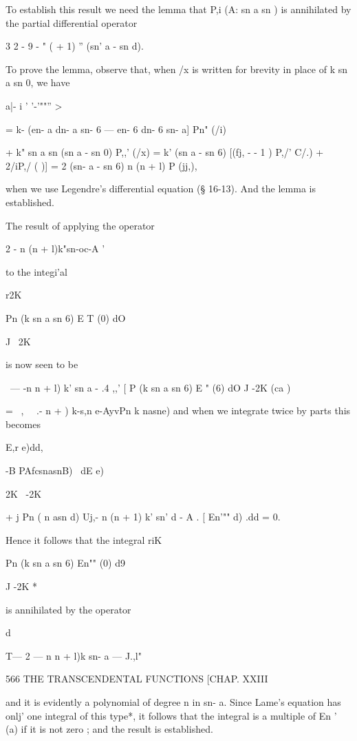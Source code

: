 {{{{{{{To establish this result we need the lemma that P,i (A: sn a sn ) is
annihilated by the partial differential operator

3 2 - 9 - " ( + 1) '' (sn' a - sn d).

To prove the lemma, observe that, when /x is written for brevity in
place of k sn a sn 0, we have



 a|- i ' '-'""'' >



= k- (en- a dn- a sn- 6 — en- 6 dn- 6 sn- a] Pn" (/i)

+ k" sn a sn (sn a - sn 0) P,,' (/x) = k' (sn a - sn 6) [(fj, - - 1 )
P,/' C/.) + 2/iP,/ ( )] = 2 (sn- a - sn 6) n (n + l) P (jj,),

when we use Legendre's differential equation (§ 16-13). And the lemma
is established.

The result of applying the operator

 2 - n (n + l)k"sn-oc-A '

to the integi'al

r2K

Pn (k sn a sn 6) E T (0) dO

J ~2K

is now seen to be

\ — -n n + l) k' sn a - .4 ,,' [ P (k sn a sn 6) E " (6) dO J -2K (ca
)



= \ , \ \ .- n + ) k-s,n e-AyvPn k nasne) and when we integrate twice
by parts this becomes



E,r e)dd,



-B PAfcsnasnB) \ dE e)



2K \ -2K



+ j Pn ( n asn d) Uj,- n (n + 1) k' sn' d - A . [ En'"" d) .dd = 0.

Hence it follows that the integral riK

Pn (k sn a sn 6) En"" (0) d9

J -2K *

is annihilated by the operator

d

T— 2 — n n + l)k sn- a — J.,l"



566 THE TRANSCENDENTAL FUNCTIONS [CHAP. XXIII

and it is evidently a polynomial of degree n in sn- a. Since Lame's
equation has onlj' one integral of this type*, it follows that the
integral is a multiple of En ' (a) if it is not zero ; and the result
is established.

}}}}}}}
